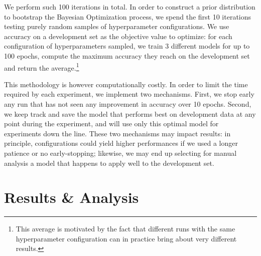\documentclass[twocolumn]{article}
\begin{document}
We perform such 100 iterations in total.
In order to construct a prior distribution to bootstrap the Bayesian Optimization process, we spend the first 10 iterations testing purely random samples of hyperparameter configurations. 
We use accuracy on a development set as the objective value to optimize: for each configuration of hyperparameters sampled, we train 3 different models for up to 100 epochs, compute the maximum accuracy they reach on the development set and return the average.\footnote{
    This average is motivated by the fact that different runs with the same hyperparameter configuration can in practice bring about very different results.
}

This methodology is however computationally costly. %
In order to limit the time required by each experiment, we implement two mechanisms.
First, we stop early any run that has not seen any improvement in accuracy over 10 epochs.
Second, we keep track and save the model that performs best on development data at any point during the experiment, and will use only this optimal model for experiments down the line.
These two mechanisms may impact results: in principle, configurations could yield higher performances if we used a longer patience or no early-stopping; likewise, we may end up selecting for manual analysis a model that happens to apply well to the development set.

\section{Results \& Analysis} \label{sec:results}
\end{document}
